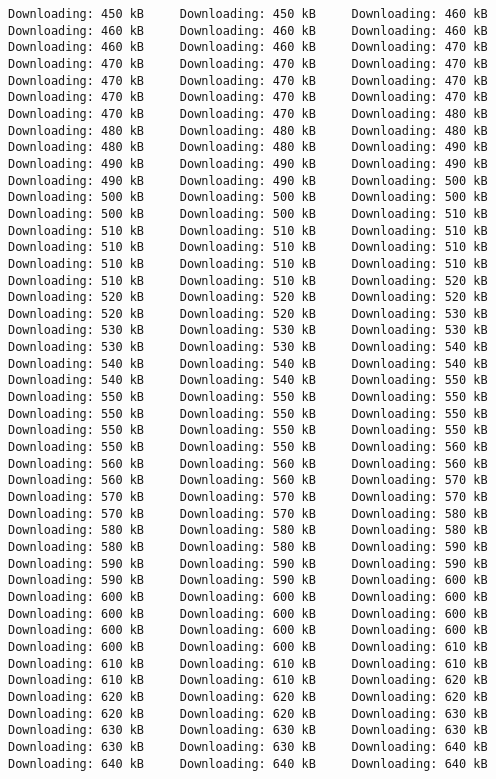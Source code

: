 \documentclass[gc, manuscript]{copernicus}
\begin{document}
\begin{verbatim}
Downloading: 450 kB     Downloading: 450 kB     Downloading: 460 kB     Downloading: 460 kB     Downloading: 460 kB     Downloading: 460 kB     Downloading: 460 kB     Downloading: 460 kB     Downloading: 470 kB     Downloading: 470 kB     Downloading: 470 kB     Downloading: 470 kB     Downloading: 470 kB     Downloading: 470 kB     Downloading: 470 kB     Downloading: 470 kB     Downloading: 470 kB     Downloading: 470 kB     Downloading: 470 kB     Downloading: 470 kB     Downloading: 480 kB     Downloading: 480 kB     Downloading: 480 kB     Downloading: 480 kB     Downloading: 480 kB     Downloading: 480 kB     Downloading: 490 kB     Downloading: 490 kB     Downloading: 490 kB     Downloading: 490 kB     Downloading: 490 kB     Downloading: 490 kB     Downloading: 500 kB     Downloading: 500 kB     Downloading: 500 kB     Downloading: 500 kB     Downloading: 500 kB     Downloading: 500 kB     Downloading: 510 kB     Downloading: 510 kB     Downloading: 510 kB     Downloading: 510 kB     Downloading: 510 kB     Downloading: 510 kB     Downloading: 510 kB     Downloading: 510 kB     Downloading: 510 kB     Downloading: 510 kB     Downloading: 510 kB     Downloading: 510 kB     Downloading: 520 kB     Downloading: 520 kB     Downloading: 520 kB     Downloading: 520 kB     Downloading: 520 kB     Downloading: 520 kB     Downloading: 530 kB     Downloading: 530 kB     Downloading: 530 kB     Downloading: 530 kB     Downloading: 530 kB     Downloading: 530 kB     Downloading: 540 kB     Downloading: 540 kB     Downloading: 540 kB     Downloading: 540 kB     Downloading: 540 kB     Downloading: 540 kB     Downloading: 550 kB     Downloading: 550 kB     Downloading: 550 kB     Downloading: 550 kB     Downloading: 550 kB     Downloading: 550 kB     Downloading: 550 kB     Downloading: 550 kB     Downloading: 550 kB     Downloading: 550 kB     Downloading: 550 kB     Downloading: 550 kB     Downloading: 560 kB     Downloading: 560 kB     Downloading: 560 kB     Downloading: 560 kB     Downloading: 560 kB     Downloading: 560 kB     Downloading: 570 kB     Downloading: 570 kB     Downloading: 570 kB     Downloading: 570 kB     Downloading: 570 kB     Downloading: 570 kB     Downloading: 580 kB     Downloading: 580 kB     Downloading: 580 kB     Downloading: 580 kB     Downloading: 580 kB     Downloading: 580 kB     Downloading: 590 kB     Downloading: 590 kB     Downloading: 590 kB     Downloading: 590 kB     Downloading: 590 kB     Downloading: 590 kB     Downloading: 600 kB     Downloading: 600 kB     Downloading: 600 kB     Downloading: 600 kB     Downloading: 600 kB     Downloading: 600 kB     Downloading: 600 kB     Downloading: 600 kB     Downloading: 600 kB     Downloading: 600 kB     Downloading: 600 kB     Downloading: 600 kB     Downloading: 610 kB     Downloading: 610 kB     Downloading: 610 kB     Downloading: 610 kB     Downloading: 610 kB     Downloading: 610 kB     Downloading: 620 kB     Downloading: 620 kB     Downloading: 620 kB     Downloading: 620 kB     Downloading: 620 kB     Downloading: 620 kB     Downloading: 630 kB     Downloading: 630 kB     Downloading: 630 kB     Downloading: 630 kB     Downloading: 630 kB     Downloading: 630 kB     Downloading: 640 kB     Downloading: 640 kB     Downloading: 640 kB     Downloading: 640 kB     
\end{verbatim}
\end{document}
